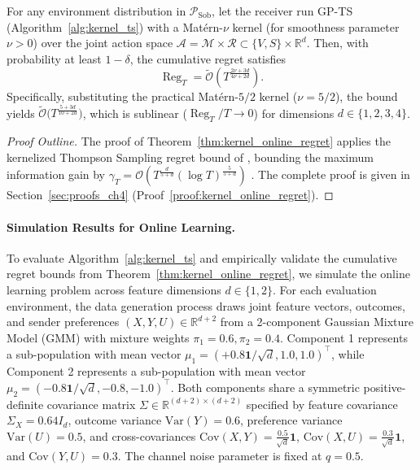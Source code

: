 \begin{theorem}\label{thm:kernel_online_regret}
For any environment distribution in $\mathcal{P}_{\text{Sob}}$, let the receiver run GP-TS (Algorithm~\ref{alg:kernel_ts}) with a Matérn-$\nu$ kernel (for smoothness parameter $\nu > 0$) over the joint action space $\mathcal{A} = \mathcal{M} \times \mathcal{R} \subset \{V, S\} \times \mathbb{R}^d$. Then, with probability at least $1 - \delta$, the cumulative regret satisfies
\begin{equation}
\label{eq:kernel_online_regret_bound}
    \operatorname{Reg}_T = \widetilde{\mathcal{O}}\left( T^{\frac{2\nu+3d}{4\nu+2d}} \right).
\end{equation}
Specifically, substituting the practical Matérn-$5/2$ kernel ($\nu=5/2$), the bound yields $\widetilde{\mathcal{O}}\bigl( T^{\frac{5+3d}{10+2d}} \bigr)$, which is sublinear ($\operatorname{Reg}_T/T \to 0$) for dimensions $d \in \{1, 2, 3, 4\}$.
\end{theorem}
\begin{proof}[Proof Outline]
The proof of Theorem~\ref{thm:kernel_online_regret} applies the kernelized Thompson Sampling regret bound of \citet[Theorem 4]{chowdhury2017kernelized}, bounding the maximum information gain by $\gamma_T = \mathcal{O}\left(T^{\frac{d}{5+d}} (\log T)^{\frac{5}{5+d}}\right)$ \citep[Table 1, Theorem 1]{vakili2021information}. The complete proof is given in Section~\ref{sec:proofs_ch4} (Proof~\ref{proof:kernel_online_regret}).
\end{proof}

\paragraph{Simulation Results for Online Learning.}

To evaluate Algorithm~\ref{alg:kernel_ts} and empirically validate the cumulative regret bounds from Theorem~\ref{thm:kernel_online_regret}, we simulate the online learning problem across feature dimensions $d \in \{1, 2\}$. For each evaluation environment, the data generation process draws joint feature vectors, outcomes, and sender preferences $(X, Y, U) \in \mathbb{R}^{d+2}$ from a 2-component Gaussian Mixture Model (GMM) with mixture weights $\pi_1 = 0.6, \pi_2 = 0.4$. Component 1 represents a sub-population with mean vector $\mu_1 = (+0.8 \mathbf{1}/\sqrt{d}, 1.0, 1.0)^\top$, while Component 2 represents a sub-population with mean vector $\mu_2 = (-0.8 \mathbf{1}/\sqrt{d}, -0.8, -1.0)^\top$. Both components share a symmetric positive-definite covariance matrix $\Sigma \in \mathbb{R}^{(d+2) \times (d+2)}$ specified by feature covariance $\Sigma_X = 0.64 I_d$, outcome variance $\mathrm{Var}(Y) = 0.6$, preference variance $\mathrm{Var}(U) = 0.5$, and cross-covariances $\mathrm{Cov}(X,Y) = \frac{0.5}{\sqrt{d}}\mathbf{1}$, $\mathrm{Cov}(X,U) = \frac{0.3}{\sqrt{d}}\mathbf{1}$, and $\mathrm{Cov}(Y,U) = 0.3$. The channel noise parameter is fixed at $q = 0.5$.

